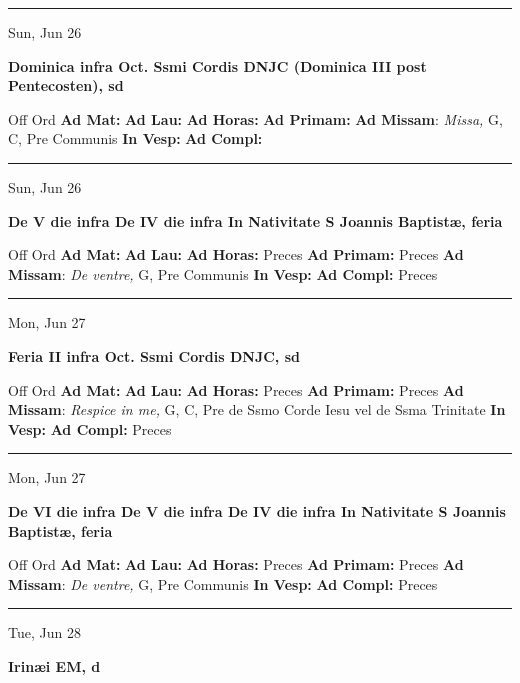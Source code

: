\documentclass[letterpaper, 10pt]{article}
\begin{document}
\hrule
\begin{center}
Sun, Jun 26
\end{center}\textbf{ \large Dominica infra Oct. Ssmi Cordis DNJC (Dominica III post Pentecosten), \textnormal{\normalsize sd}}
\begin{justify}
Off Ord
\textbf{Ad Mat: }
\textbf{Ad Lau: }
\textbf{Ad Horas: }
\textbf{Ad Primam: }
\textbf{Ad Missam}: \textit{Missa,} G, C, Pre Communis
\textbf{In Vesp: }
\textbf{Ad Compl: }\end{justify}



\hrule
\begin{center}
Sun, Jun 26
\end{center}\textbf{ \large De V die infra De IV die infra In Nativitate S Joannis Baptistæ, \textnormal{\normalsize feria}}
\begin{justify}
Off Ord
\textbf{Ad Mat: }
\textbf{Ad Lau: }
\textbf{Ad Horas: }Preces
\textbf{Ad Primam: }Preces
\textbf{Ad Missam}: \textit{De ventre,} G, Pre Communis
\textbf{In Vesp: }
\textbf{Ad Compl: }Preces\end{justify}



\hrule
\begin{center}
Mon, Jun 27
\end{center}\textbf{ \large Feria II infra Oct. Ssmi Cordis DNJC, \textnormal{\normalsize sd}}
\begin{justify}
Off Ord
\textbf{Ad Mat: }
\textbf{Ad Lau: }
\textbf{Ad Horas: }Preces
\textbf{Ad Primam: }Preces
\textbf{Ad Missam}: \textit{Respice in me,} G, C, Pre de Ssmo Corde Iesu vel de Ssma Trinitate
\textbf{In Vesp: }
\textbf{Ad Compl: }Preces\end{justify}



\hrule
\begin{center}
Mon, Jun 27
\end{center}\textbf{ \large De VI die infra De V die infra De IV die infra In Nativitate S Joannis Baptistæ, \textnormal{\normalsize feria}}
\begin{justify}
Off Ord
\textbf{Ad Mat: }
\textbf{Ad Lau: }
\textbf{Ad Horas: }Preces
\textbf{Ad Primam: }Preces
\textbf{Ad Missam}: \textit{De ventre,} G, Pre Communis
\textbf{In Vesp: }
\textbf{Ad Compl: }Preces\end{justify}



\hrule
\begin{center}
Tue, Jun 28
\end{center}\textbf{ \large Irinæi EM, \textnormal{\normalsize d}}
\end{document}
